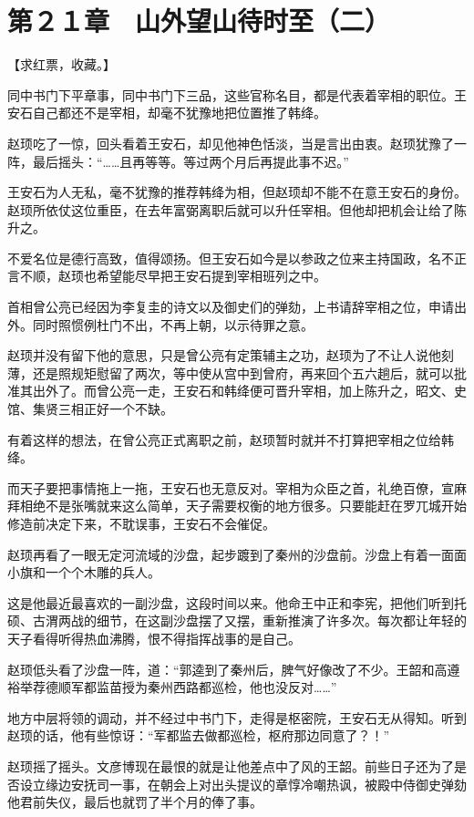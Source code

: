 \section{第２１章　山外望山待时至（二）}

【求红票，收藏。】

同中书门下平章事，同中书门下三品，这些官称名目，都是代表着宰相的职位。王安石自己都还不是宰相，却毫不犹豫地把位置推了韩绛。

赵顼吃了一惊，回头看着王安石，却见他神色恬淡，当是言出由衷。赵顼犹豫了一阵，最后摇头：“……且再等等。等过两个月后再提此事不迟。”

王安石为人无私，毫不犹豫的推荐韩绛为相，但赵顼却不能不在意王安石的身份。赵顼所依仗这位重臣，在去年富弼离职后就可以升任宰相。但他却把机会让给了陈升之。

不爱名位是德行高致，值得颂扬。但王安石如今是以参政之位来主持国政，名不正言不顺，赵顼也希望能尽早把王安石提到宰相班列之中。

首相曾公亮已经因为李复圭的诗文以及御史们的弹劾，上书请辞宰相之位，申请出外。同时照惯例杜门不出，不再上朝，以示待罪之意。

赵顼并没有留下他的意思，只是曾公亮有定策辅主之功，赵顼为了不让人说他刻薄，还是照规矩慰留了两次，等中使从宫中到曾府，再来回个五六趟后，就可以批准其出外了。而曾公亮一走，王安石和韩绛便可晋升宰相，加上陈升之，昭文、史馆、集贤三相正好一个不缺。

有着这样的想法，在曾公亮正式离职之前，赵顼暂时就并不打算把宰相之位给韩绛。

而天子要把事情拖上一拖，王安石也无意反对。宰相为众臣之首，礼绝百僚，宣麻拜相绝不是张嘴就来这么简单，天子需要权衡的地方很多。只要能赶在罗兀城开始修造前决定下来，不耽误事，王安石不会催促。

赵顼再看了一眼无定河流域的沙盘，起步踱到了秦州的沙盘前。沙盘上有着一面面小旗和一个个木雕的兵人。

这是他最近最喜欢的一副沙盘，这段时间以来。他命王中正和李宪，把他们听到托硕、古渭两战的细节，在这副沙盘摆了又摆，重新推演了许多次。每次都让年轻的天子看得听得热血沸腾，恨不得指挥战事的是自己。

赵顼低头看了沙盘一阵，道：“郭逵到了秦州后，脾气好像改了不少。王韶和高遵裕举荐德顺军都监苗授为秦州西路都巡检，他也没反对……”

地方中层将领的调动，并不经过中书门下，走得是枢密院，王安石无从得知。听到赵顼的话，他有些惊讶：“军都监去做都巡检，枢府那边同意了？！”

赵顼摇了摇头。文彦博现在最恨的就是让他差点中了风的王韶。前些日子还为了是否设立缘边安抚司一事，在朝会上对出头提议的章惇冷嘲热讽，被殿中侍御史弹劾他君前失仪，最后也就罚了半个月的俸了事。

